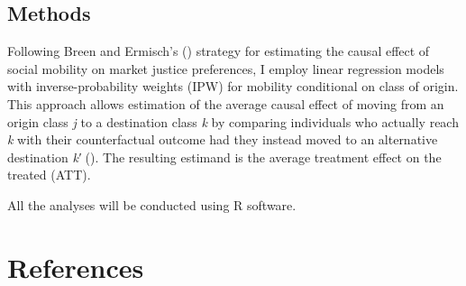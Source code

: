 \documentclass[
  13pt,
]{article}
\begin{document}
\subsection{Methods}\label{methods}

Following Breen and Ermisch's ()
strategy for estimating the causal effect of social mobility on market
justice preferences, I employ linear regression models with
inverse-probability weights (IPW) for mobility conditional on class of
origin. This approach allows estimation of the average causal effect of
moving from an origin class \emph{j} to a destination class \emph{k} by
comparing individuals who actually reach \emph{k} with their
counterfactual outcome had they instead moved to an alternative
destination \emph{k′} (). The resulting estimand is the average treatment effect
on the treated (ATT).

All the analyses will be conducted using R software.

\section{References}\label{references}
\end{document}
